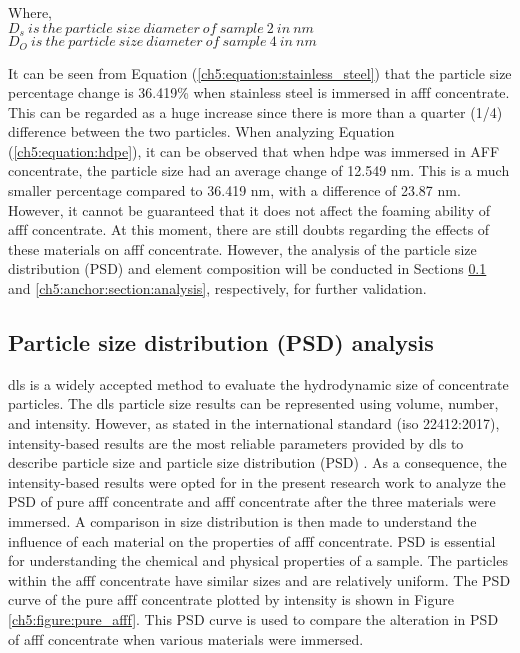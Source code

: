 \begin{doublespace}
Where, \\
$D_s\ is\ the\ particle\ size\ diameter\ of\ sample\ 2\ in\ nm$ \\
$D_O\ is\ the\ particle\ size\ diameter\ of\ sample\ 4\ in\ nm$ \\
\end{doublespace}

It can be seen from Equation (\ref{ch5:equation:stainless_steel}) that the particle size percentage change is 36.419\% when stainless steel is immersed in \acrshort{afff} concentrate. This can be regarded as a huge increase since there is more than a quarter (1/4) difference between the two particles. When analyzing Equation (\ref{ch5:equation:hdpe}), it can be observed that when \acrshort{hdpe} was immersed in AFF concentrate, the particle size had an average change of 12.549 nm. This is a much smaller percentage compared to 36.419 nm, with a difference of 23.87 nm. However, it cannot be guaranteed that it does not affect the foaming ability of \acrshort{afff} concentrate. At this moment, there are still doubts regarding the effects of these materials on \acrshort{afff} concentrate. However, the analysis of the particle size distribution (PSD) and element composition will be conducted in Sections \ref{ch5:anchor:section:psd} and \ref{ch5:anchor:section:analysis}, respectively, for further validation.

\subsection{Particle size distribution (PSD) analysis}
\label{ch5:anchor:section:psd}
\acrshort{dls} is a widely accepted method to evaluate the hydrodynamic size of concentrate particles. The \acrshort{dls} particle size results can be represented using volume, number, and intensity. However, as stated in the international standard (\acrshort{iso} 22412:2017), intensity-based results are the most reliable parameters provided by \acrshort{dls} to describe particle size and particle size distribution (PSD) \cite{ramirez2021characterization}. As a consequence, the intensity-based results were opted for in the present research work to analyze the PSD of pure \acrshort{afff} concentrate and \acrshort{afff} concentrate after the three materials were immersed. A comparison in size distribution is then made to understand the influence of each material on the properties of \acrshort{afff} concentrate. PSD is essential for understanding the chemical and physical properties of a sample. The particles within the \acrshort{afff} concentrate have similar sizes and are relatively uniform. The PSD curve of the pure \acrshort{afff} concentrate plotted by intensity is shown in Figure \ref{ch5:figure:pure_afff}. This PSD curve is used to compare the alteration in PSD of \acrshort{afff} concentrate when various materials were immersed.

